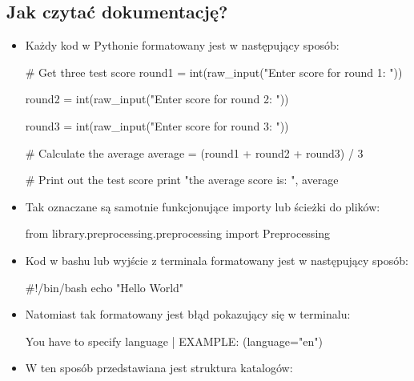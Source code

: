 \newpage
\subsection{Jak czytać dokumentację?}


\begin{itemize}
\item Każdy kod w Pythonie formatowany jest w następujący sposób:

\begin{python}
# Get three test score
round1 = int(raw_input("Enter score for round 1: "))

round2 = int(raw_input("Enter score for round 2: "))

round3 = int(raw_input("Enter score for round 3: "))
   
# Calculate the average
average = (round1 + round2 + round3) / 3

# Print out the test score
print "the average score is: ", average 

\end{python}

\item Tak oznaczane są samotnie funkcjonujące importy lub ścieżki do plików:
\begin{import}
from library.preprocessing.preprocessing import Preprocessing
\end{import}

\item Kod w bashu lub wyjście z terminala formatowany jest w następujący sposób:

\begin{bash}
#!/bin/bash
echo "Hello World"
\end{bash}

\item Natomiast tak formatowany jest błąd pokazujący się w terminalu:
\begin{consolerror}
You have to specify language | EXAMPLE: (language="en")
\end{consolerror}



\item W ten sposób przedstawiana jest struktura katalogów:
\myspace
{}

\end{itemize}